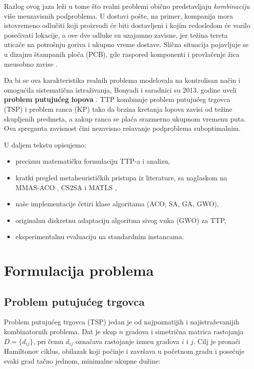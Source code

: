 \documentclass[12pt,a4paper]{article}
\begin{document}
Razlog ovog jaza le\v{z}i u tome \v{s}to realni problemi obi\v{c}no predstavljaju \textit{kombinaciju} vi\v{s}e me\dj{}uzavisnih podproblema. U dostavi po\v{s}te, na primer, kompanija mora istovremeno odlu\v{c}iti koji proizvodi \'{c}e biti dostavljeni i kojim redosledom \'{c}e vozilo pose\'{c}ivati lokacije, a ove dve odluke su uzajamno zavisne, jer te\v{z}ina tereta utica\v{c}e na potro\v{s}nju goriva i ukupno vreme dostave. Sli\v{c}na situacija pojavljuje se u dizajnu \v{s}tampanih ploča (PCB), gde raspored komponenti i provlačenje žica me\dj{}usobno zavise \cite{bonyadi2013}.

Da bi se ova karakteristika realnih problema modelovala na kontrolisan na\v{c}in i omogu\'{c}ila sistemati\v{c}na istra\v{z}ivanja, Bonyadi i saradnici su 2013. godine uveli \textbf{problem putuju\'{c}eg lopova} \cite{bonyadi2013}. TTP kombinuje problem putuju\'{c}eg trgovca (TSP) i problem ranca (KP) tako da brzina kretanja lopova zavisi od te\v{z}ine skupljenih predmeta, a zakup ranca se pla\'{c}a srazmerno ukupnom vremenu puta. Ova spregnuta zavisnost \v{c}ini nezavisno re\v{s}avanje podproblema suboptimalnim.

U daljem tekstu opisujemo:
\begin{itemize}
    \item preciznu matemati\v{c}ku formulaciju TTP-a i analizu,
    \item kratki pregled metaheuristi\v{c}kih pristupa iz literature, sa naglaskom na MMAS-ACO \cite{wagner2016}, CS2SA \cite{yafrani2016} i MATLS \cite{mei2014},
    \item na\v{s}e implementacije \v{c}etiri klase algoritama (ACO, SA, GA, GWO),
    \item originalnu diskretnu adaptaciju algoritma sivog vuka (GWO) za TTP,
    \item eksperimentalnu evaluaciju na standardnim instancama.
\end{itemize}

\section{Formulacija problema}

\subsection{Problem putuju\'{c}eg trgovca}

Problem putuju\'{c}eg trgovca (TSP) jedan je od najpoznatijih i najistra\v{z}evanijih kombinatornih problema. Dat je skup $n$ gradova i simetri\v{c}na matrica rastojanja $D = \{d_{ij}\}$, pri \v{c}emu $d_{ij}$ ozna\v{c}ava rastojanje izme\dj{}u gradova $i$ i $j$. Cilj je prona\'{c}i Hamiltonov ciklus, obilazak koji po\v{c}inje i zavr\v{s}ava u po\v{c}etnom gradu i pose\'{c}uje svaki grad ta\v{c}no jednom, minimalne ukupne du\v{z}ine:
\end{document}
